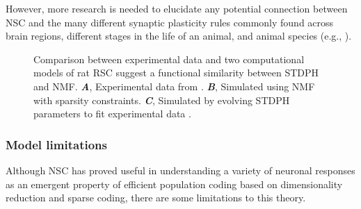 However, more research is needed to elucidate any potential connection 
between \ac{NSC} and the many different synaptic plasticity rules 
commonly found across brain regions,
different stages in the life of an animal, and animal species
(e.g., \cite{Froemke2010,BCM1982}).

\begin{figure}[h]
	\centering
    \caption{
    	Comparison between experimental data and two 
        computational models of rat \ac{RSC} suggest a functional 
        similarity between \ac{STDPH} and \ac{NMF}.
        \textbf{\emph{A}},
    		Experimental data from \cite{AlexanderNitz2015}.
        \textbf{\emph{B}},
            Simulated using NMF with sparsity constraints.
        \textbf{\emph{C}},
            Simulated by evolving \ac{STDPH} parameters 
            to fit experimental data \cite{BeyelerCarlsonChou2015,Carlson2014}.
	}
 	\label{fig:NMF|RSC}
\end{figure}



\subsubsection*{Model limitations}

Although \ac{NSC} has proved useful in understanding
a variety of neuronal responses
as an emergent property of efficient population
coding based on dimensionality reduction and sparse coding,
there are some limitations to this theory.

